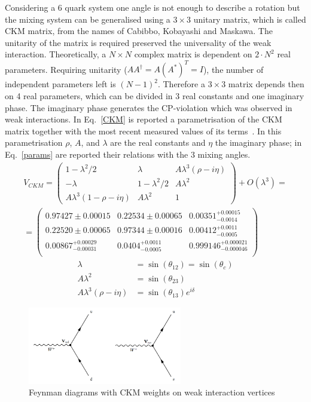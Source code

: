 Considering a 6 quark system one angle is not enough to describe a rotation but the mixing system can be generalised
using a $3 \times 3$ unitary matrix, which is called CKM matrix, from the names of Cabibbo, Kobayashi and Maskawa.
The unitarity of the matrix is required preserved the universality of the weak interaction. Theoretically, a $N \times N$ complex
matrix is dependent on $2 \cdot N^2$ real parameters. Requiring unitarity ($AA^\dagger = A(A^*)^T = I$), the number
of independent parameters left is $(N - 1)^2$. Therefore a $3 \times 3$ matrix depends then on 4 real parameters, which
can be divided in 3 real constants and one imaginary phase. The imaginary phase generates the CP-violation which was
observed in weak interactions. In Eq.~\ref{CKM} is reported a parametrisation of the CKM matrix together with the most
recent measured values of its terms~\cite{PDG2014}. In this parametrisation $\rho$, $A$, and $\lambda$
are the real constants and $\eta$ the imaginary phase; in Eq.~\ref{params} are reported their relations with the 3 mixing angles.
%
\begin{multline}
V_{CKM} = \left( \begin{array}{ccc}
1 - \lambda^2/2 & \lambda  & A \lambda^3(\rho -i\eta) \\
-\lambda & 1 - \lambda^2/2 & A\lambda^2 \\
A \lambda^3(1 - \rho -i\eta) & A\lambda^2 & 1 
\end{array} \right) + O(\lambda^3)= \\
= \left( \begin{array}{ccc}
0.97427 \pm 0.00015 & 0.22534 \pm 0.00065 & 0.00351^{+0.00015}_{-0.0014} \\
 0.22520 \pm 0.00065 & 0.97344 \pm 0.00016 & 0.00412^{+0.0011}_{-0.0005} \\
 0.00867^{+0.00029}_{-0.00031} & 0.0404^{+0.0011}_{-0.0005} & 0.999146^{+0.000021}_{-0.000046} \\
\end{array} \right)
\label{CKM}
\end{multline}
%
\begin{align}
\lambda & = \sin(\theta_{12}) = \sin(\theta_c) \\
A\lambda^2 & = \sin(\theta_{23}) \\
A\lambda^3(\rho - i\eta) & = \sin(\theta_{13})e^{i\delta}
\label{params}
\end{align}
%
\begin{figure}[h!]
\centering 
\includegraphics[width=0.6\textwidth]{Introduction/figs/ch_currents_ckm.png}
\caption{Feynman diagrams with CKM weights on weak interaction vertices}
\label{fig:ch_currents_ckm}
\end{figure}
